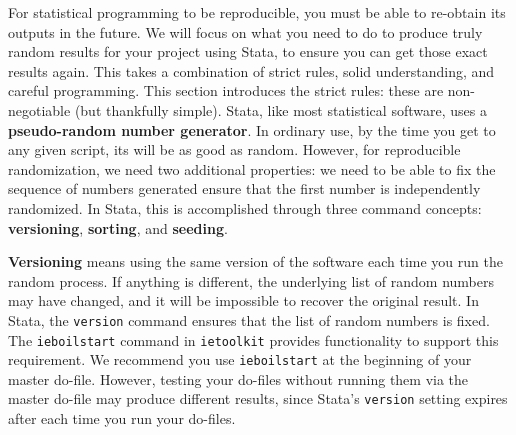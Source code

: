 For statistical programming to be reproducible,
you must be able to re-obtain its outputs in the future.\cite{orozco2018make}
We will focus on what you need to do to produce
truly random results for your project using Stata,
to ensure you can get those exact results again.
This takes a combination of strict rules, solid understanding, and careful programming.
This section introduces the strict rules:
these are non-negotiable (but thankfully simple).
Stata, like most statistical software, uses a \textbf{pseudo-random number generator}.
In ordinary use, by the time you get to any given script, its will be as good as random.
However, for reproducible randomization, we need two additional properties:
we need to be able to fix the sequence of numbers generated
ensure that the first number is independently randomized.
In Stata, this is accomplished through three command concepts:
\textbf{versioning}, \textbf{sorting}, and \textbf{seeding}.

\textbf{Versioning} means using the same version of the software each time you run the random process.
If anything is different, the underlying list of random numbers may have changed,
and it will be impossible to recover the original result.
In Stata, the \texttt{version} command ensures that the list of random numbers is fixed.
The \texttt{ieboilstart} command in \texttt{ietoolkit} provides functionality to support this requirement.
We recommend you use \texttt{ieboilstart} at the beginning of your master do-file.
However, testing your do-files without running them
via the master do-file may produce different results,
since Stata's \texttt{version} setting expires after each time you run your do-files.

